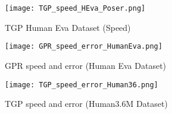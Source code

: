 \begin{figure}
\texttt{[image: TGP\_speed\_HEva\_Poser.png]}
\caption{TGP Human Eva Dataset (Speed)}
\label{fig_TGP_speedup_hp}
\end{figure}


\begin{figure}
\texttt{[image: GPR\_speed\_error\_HumanEva.png]}
\caption{GPR speed and error (Human Eva Dataset)}
\label{fig_GPR_speedup_hp}
\end{figure}


\begin{figure}
\texttt{[image: TGP\_speed\_error\_Human36.png]}
\caption{TGP speed and error (Human3.6M Dataset)}
\label{fig_TGP_speedup_h36}
\end{figure}




